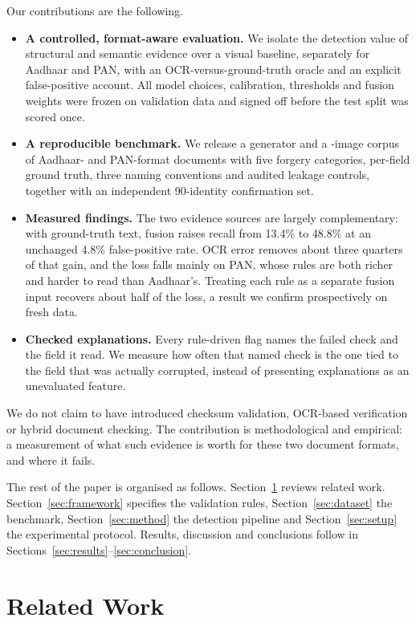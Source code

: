 \documentclass[conference]{IEEEtran}
\begin{document}
Our contributions are the following.
\begin{itemize}
\item \textbf{A controlled, format-aware evaluation.} We isolate the
detection value of structural and semantic evidence over a visual
baseline, separately for Aadhaar and PAN, with an OCR-versus-ground-truth
oracle and an explicit false-positive account. All model choices,
calibration, thresholds and fusion weights were frozen on validation
data and signed off before the test split was scored once.
\item \textbf{A reproducible benchmark.} We release a generator and a
\dsImages{}-image corpus of Aadhaar- and PAN-format documents with five
forgery categories, per-field ground truth, three naming conventions and
audited leakage controls, together with an independent 90-identity
confirmation set.
\item \textbf{Measured findings.} The two evidence sources are largely
complementary: with ground-truth text, fusion raises recall
from 13.4\% to 48.8\% at an unchanged 4.8\% false-positive rate. OCR
error removes about three quarters of that gain, and the loss falls mainly on
PAN, whose rules are both richer and harder to read than Aadhaar's.
Treating each rule as a separate fusion input recovers about half of
the loss, a result we confirm prospectively on fresh data.
\item \textbf{Checked explanations.} Every rule-driven flag names the
failed check and the field it read. We measure how often that named
check is the one tied to the field that was actually corrupted, instead
of presenting explanations as an unevaluated feature.
\end{itemize}

We do not claim to have introduced checksum validation, OCR-based
verification or hybrid document checking. The contribution is
methodological and empirical: a measurement of what such
evidence is worth for these two document formats, and where it fails.

The rest of the paper is organised as follows. Section~\ref{sec:related}
reviews related work. Section~\ref{sec:framework} specifies the
validation rules, Section~\ref{sec:dataset} the benchmark,
Section~\ref{sec:method} the detection pipeline and
Section~\ref{sec:setup} the experimental protocol. Results, discussion
and conclusions follow in Sections~\ref{sec:results}--\ref{sec:conclusion}.

\section{Related Work}
\label{sec:related}
\end{document}
